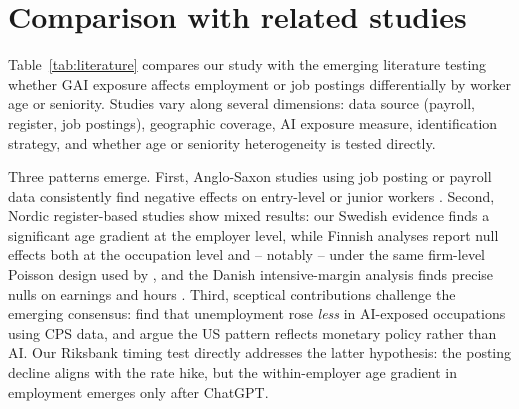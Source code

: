 \documentclass[preprint,12pt,authoryear]{elsarticle}
\begin{document}
\section{Comparison with related studies}
\label{sec:literature_comparison}

Table~\ref{tab:literature} compares our study with the emerging literature testing whether GAI exposure affects employment or job postings differentially by worker age or seniority. Studies vary along several dimensions: data source (payroll, register, job postings), geographic coverage, AI exposure measure, identification strategy, and whether age or seniority heterogeneity is tested directly.

Three patterns emerge. First, Anglo-Saxon studies using job posting or payroll data consistently find negative effects on entry-level or junior workers \citep{brynjolfsson2025canaries,hosseini2025seniority,liu2025labor,kleinteeselink2025}. Second, Nordic register-based studies show mixed results: our Swedish evidence finds a significant age gradient at the employer level, while Finnish analyses report null effects both at the occupation level \citep{kauhanen2025canaries} and -- notably -- under the same firm-level Poisson design used by \citet{brynjolfsson2025canaries} \citep{kauhanen2026youth}, and the Danish intensive-margin analysis finds precise nulls on earnings and hours \citep{humlum2025llm}. Third, sceptical contributions challenge the emerging consensus: \citet{eckhardt2025aijobs} find that unemployment rose \emph{less} in AI-exposed occupations using CPS data, and \citet{iscenko2026ladder} argue the US pattern reflects monetary policy rather than AI. Our Riksbank timing test directly addresses the latter hypothesis: the posting decline aligns with the rate hike, but the within-employer age gradient in employment emerges only after ChatGPT.
\end{document}

